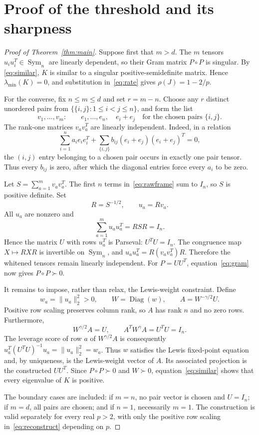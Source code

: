 \documentclass[11pt]{article}
\newcommand{\Sym}{\operatorname{Sym}}
\newcommand{\Diag}{\operatorname{Diag}}
\begin{document}
\section{Proof of the threshold and its sharpness}

\begin{proof}[Proof of Theorem~\ref{thm:main}]
Suppose first that $m>d$.  The $m$ tensors $u_i u_i^T\in\Sym_n$ are linearly
dependent, so their Gram matrix $P\circ P$ is singular.  By
\eqref{eq:similar}, $K$ is similar to a singular positive-semidefinite matrix.
Hence $\lambda_{\min}(K)=0$, and substitution in~\eqref{eq:rate} gives
$\rho(J)=1-2/p$.

For the converse, fix $n\leq m\leq d$ and set $r=m-n$.  Choose any $r$
distinct unordered pairs from $\{\{i,j\}:1\leq i<j\leq n\}$, and form the
list
\begin{equation}\label{eq:rawframe}
 v_1,\ldots,v_m:
 \qquad e_1,\ldots,e_n,
 \quad e_i+e_j\quad\text{for the chosen pairs }\{i,j\}.
\end{equation}
The rank-one matrices $v_a v_a^T$ are linearly independent.  Indeed, in a
relation
\[
 \sum_{i=1}^n a_i e_i e_i^T
 +\sum_{\{i,j\}}b_{ij}(e_i+e_j)(e_i+e_j)^T=0,
\]
the $(i,j)$ entry belonging to a chosen pair occurs in exactly one pair
tensor.  Thus every $b_{ij}$ is zero, after which the diagonal entries force
every $a_i$ to be zero.

Let $S=\sum_{a=1}^m v_a v_a^T$.  The first $n$ terms in~\eqref{eq:rawframe}
sum to $I_n$, so $S$ is positive definite.  Set
\[
 R=S^{-1/2},\qquad u_a=Rv_a.
\]
All $u_a$ are nonzero and
\[
 \sum_{a=1}^m u_a u_a^T=RSR=I_n.
\]
Hence the matrix $U$ with rows $u_a^T$ is Parseval: $U^TU=I_n$.  The
congruence map $X\mapsto RXR$ is invertible on $\Sym_n$, and
$u_a u_a^T=R(v_a v_a^T)R$.  Therefore the whitened tensors remain linearly
independent.  For $P=UU^T$, equation~\eqref{eq:gram} now gives
$P\circ P\succ0$.

It remains to impose, rather than relax, the Lewis-weight constraint.  Define
\begin{equation}\label{eq:reconstruct}
 w_a=\lVert u_a\rVert_2^2>0,\qquad
 W=\Diag(w),\qquad A=W^{-\gamma/2}U.
\end{equation}
Positive row scaling preserves column rank, so $A$ has rank $n$ and no zero
rows.  Furthermore,
\[
 W^{\gamma/2}A=U,
 \qquad A^T W^\gamma A=U^TU=I_n.
\]
The leverage score of row $a$ of $W^{\gamma/2}A$ is consequently
$u_a^T(U^TU)^{-1}u_a=\lVert u_a\rVert_2^2=w_a$.  Thus $w$ satisfies the
Lewis fixed-point equation and, by uniqueness, is the Lewis-weight vector of
$A$.  Its associated projection is the constructed $UU^T$.  Since
$P\circ P\succ0$ and $W\succ0$, equation~\eqref{eq:similar} shows that every
eigenvalue of $K$ is positive.

The boundary cases are included: if $m=n$, no pair vector is chosen and
$U=I_n$; if $m=d$, all pairs are chosen; and if $n=1$, necessarily $m=1$.
The construction is valid separately for every real $p>2$, with only the
positive row scaling in~\eqref{eq:reconstruct} depending on $p$.
\end{proof}
\end{document}
